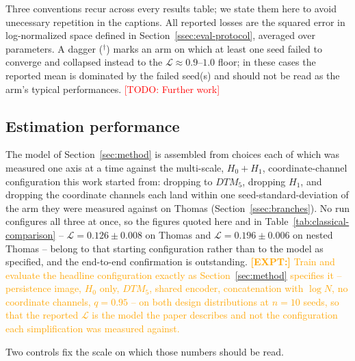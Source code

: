 \documentclass[11pt,letterpaper]{article}
\newcommand{\1}{\mathds{1}}
\newcommand{\todo}[1]{\textcolor{red}{[TODO: #1]}}
\newcommand{\fix}[1]{\textcolor{blue}{[FIX: #1]}}
\newcommand{\expt}[1]{\textcolor{orange}{\textbf{[EXPT:] }#1}}
\newcommand{\todo}[1]{}\newcommand{\fix}[1]{}
\theoremstyle{plain}
\theoremstyle{definitioncolon}
\begin{document}
Three conventions recur across every results table; we state them here to avoid
unecessary repetition in the captions. All reported losses are the
squared error in log-normalized space defined in Section~\ref{ssec:eval-protocol},
averaged over parameters. A dagger ($^\dagger$) marks an arm on
which at least one seed failed to converge and collapsed instead to the
$\mathcal{L}\approx0.9$--$1.0$ floor; in these cases the reported
mean is dominated by the failed seed(s) and should not be read as the arm's
typical performances. \todo{Further work}

\subsection{Estimation performance}
\label{ssec:exp-performance}

The model of Section~\ref{sec:method} is assembled from choices each of which
was measured one axis at a time against the multi-scale, $H_0{+}H_1$,
coordinate-channel configuration this work started from: dropping to $DTM_5$,
dropping $H_1$, and dropping the coordinate channels each land within one
seed-standard-deviation of the arm they were measured against on Thomas
(Section~\ref{ssec:branches}). No run configures all three at once, so the
figures quoted here and in Table~\ref{tab:classical-comparison} --
$\mathcal{L}=0.126\pm0.008$ on Thomas and $\mathcal{L}=0.196\pm0.006$ on nested
Thomas -- belong to that starting configuration rather than to the model as
specified, and the end-to-end confirmation is outstanding.
\expt{Train and evaluate the headline configuration exactly as Section~\ref{sec:method}
specifies it -- persistence image, $H_0$ only, $DTM_5$, shared encoder,
concatenation with $\log N$, no coordinate channels, $q=0.95$ -- on both design
distributions at $n=10$ seeds, so that the reported $\mathcal{L}$ is the model
the paper describes and not the configuration each simplification was measured
against.}

Two controls fix the scale on which those numbers should be read.
\end{document}
